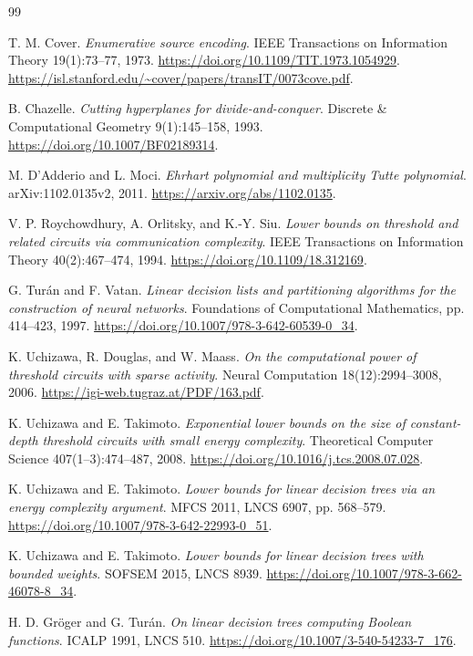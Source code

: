 \documentclass[11pt]{article}
\theoremstyle{definition}
\begin{document}
\begin{thebibliography}{99}
\small\raggedright\setlength{\parskip}{0pt}\setlength{\itemsep}{5pt}
T. M. Cover.
\emph{Enumerative source encoding}.
IEEE Transactions on Information Theory 19(1):73--77, 1973.
\url{https://doi.org/10.1109/TIT.1973.1054929}.
\url{https://isl.stanford.edu/~cover/papers/transIT/0073cove.pdf}.

B. Chazelle.
\emph{Cutting hyperplanes for divide-and-conquer}.
Discrete \& Computational Geometry 9(1):145--158, 1993.
\url{https://doi.org/10.1007/BF02189314}.

M. D'Adderio and L. Moci.
\emph{Ehrhart polynomial and multiplicity Tutte polynomial}.
arXiv:1102.0135v2, 2011.
\url{https://arxiv.org/abs/1102.0135}.

V. P. Roychowdhury, A. Orlitsky, and K.-Y. Siu.
\emph{Lower bounds on threshold and related circuits via communication complexity}.
IEEE Transactions on Information Theory 40(2):467--474, 1994.
\url{https://doi.org/10.1109/18.312169}.

G. Tur\'an and F. Vatan.
\emph{Linear decision lists and partitioning algorithms for the construction of neural networks}.
Foundations of Computational Mathematics, pp. 414--423, 1997.
\url{https://doi.org/10.1007/978-3-642-60539-0_34}.

K. Uchizawa, R. Douglas, and W. Maass.
\emph{On the computational power of threshold circuits with sparse activity}.
Neural Computation 18(12):2994--3008, 2006.
\url{https://igi-web.tugraz.at/PDF/163.pdf}.

K. Uchizawa and E. Takimoto.
\emph{Exponential lower bounds on the size of constant-depth threshold circuits with small energy complexity}.
Theoretical Computer Science 407(1--3):474--487, 2008.
\url{https://doi.org/10.1016/j.tcs.2008.07.028}.

K. Uchizawa and E. Takimoto.
\emph{Lower bounds for linear decision trees via an energy complexity argument}.
MFCS 2011, LNCS 6907, pp. 568--579.
\url{https://doi.org/10.1007/978-3-642-22993-0_51}.

K. Uchizawa and E. Takimoto.
\emph{Lower bounds for linear decision trees with bounded weights}.
SOFSEM 2015, LNCS 8939.
\url{https://doi.org/10.1007/978-3-662-46078-8_34}.

H. D. Gr\"oger and G. Tur\'an.
\emph{On linear decision trees computing Boolean functions}.
ICALP 1991, LNCS 510.
\url{https://doi.org/10.1007/3-540-54233-7_176}.


\end{thebibliography}
\end{document}
